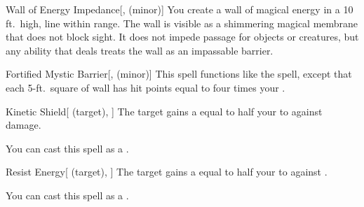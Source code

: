 \lowercase{\hypertarget{spell:Wall of Energy Impedance}{}}\label{spell:Wall of Energy Impedance}
\begin{freeability}[\nth{2}]{\hypertarget{spell:Wall of Energy Impedance}{Wall of Energy Impedance}}[,  (minor)]
\targetrule
You create a wall of magical energy in a 10 ft.\ high, \areamed line within \rngmed range.
The wall is visible as a shimmering magical membrane that does not block sight.
It does not impede passage for objects or creatures, but any ability that deals  treats the wall as an impassable barrier.
\end{freeability}
\vspace{0.25em}



\lowercase{\hypertarget{spell:Fortified Mystic Barrier}{}}\label{spell:Fortified Mystic Barrier}
\begin{freeability}[\nth{3}]{\hypertarget{spell:Fortified Mystic Barrier}{Fortified Mystic Barrier}}[,  (minor)]
\targetrule
This spell functions like the  spell, except that each 5-ft.\ square of wall has hit points equal to four times your .
\end{freeability}
\vspace{0.25em}



\lowercase{\hypertarget{spell:Kinetic Shield}{}}\label{spell:Kinetic Shield}
\begin{attuneability}[\nth{3}]{\hypertarget{spell:Kinetic Shield}{Kinetic Shield}}[ (target), ]
The target gains a  equal to half your  to  against  damage.

You can cast this spell as a .
\end{attuneability}
\vspace{0.25em}



\lowercase{\hypertarget{spell:Resist Energy}{}}\label{spell:Resist Energy}
\begin{attuneability}[\nth{3}]{\hypertarget{spell:Resist Energy}{Resist Energy}}[ (target), ]
The target gains a  equal to half your  to  against .

You can cast this spell as a .
\end{attuneability}
\vspace{0.25em}



